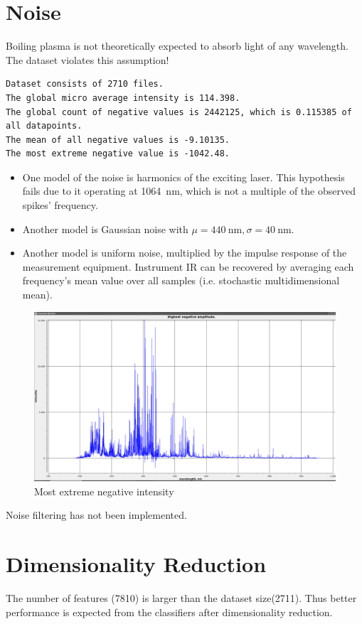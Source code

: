 \documentclass{article}
\begin{document}
\section{Noise}
Boiling plasma is not theoretically expected to absorb light of any wavelength.
The dataset violates this assumption!
\par
\begin{verbatim}
Dataset consists of 2710 files.
The global micro average intensity is 114.398.
The global count of negative values is 2442125, which is 0.115385 of all datapoints.
The mean of all negative values is -9.10135.
The most extreme negative value is -1042.48.
\end{verbatim}
\begin{itemize}
\item{One model of the noise is harmonics of the exciting laser.
This hypothesis fails due to it operating at \SI{1064}{\nano\metre}, which is not a multiple of the observed spikes' frequency.}
\item{Another model is Gaussian noise with $\mu=\SI{440}{\nano\metre}, \sigma=\SI{40}{\nano\metre}$.}
\item{Another model is uniform noise, multiplied by the impulse response of the measurement equipment.
Instrument IR can be recovered by averaging each frequency's mean value over all samples (i.e. stochastic multidimensional mean).}
\end{itemize}
\begin{figure}
\caption{Most extreme negative intensity}
\centering
\includegraphics[width=1.25\textwidth]{img/negatives}
\end{figure}
Noise filtering has not been implemented.


\section{Dimensionality Reduction}
The number of features (7810) is larger than the dataset size(2711).
Thus better performance is expected from the classifiers after dimensionality reduction.
\end{document}
